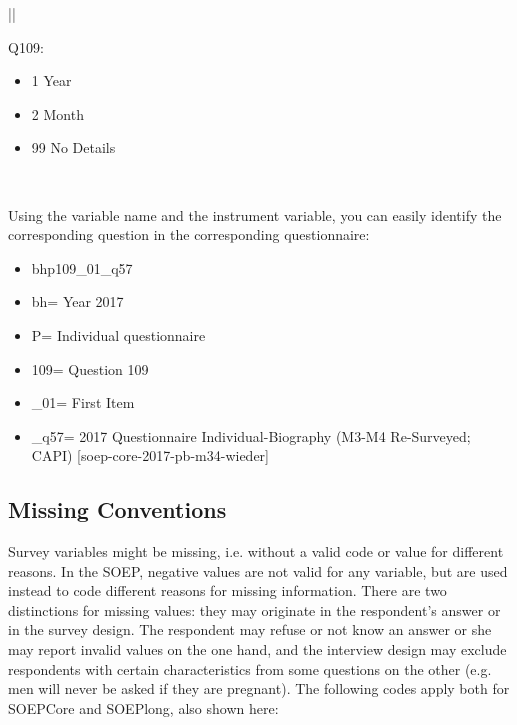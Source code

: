 \documentclass[letterpaper,10pt,openany,onesideH,english]{sphinxmanual}
\begin{document}
\begin{savenotes}\sphinxattablestart
\centering
\begin{tabular}[t]{|*{1}{|}}
\hline

Q109: 
\begin{itemize}
\item {} 
1  Year

\item {} 
2  Month

\item {} 
99 No Details

\end{itemize}
\\
\hline
\end{tabular}
\par
\sphinxattableend\end{savenotes}

Using the variable name and the instrument variable, you can easily identify the corresponding question in the corresponding questionnaire:
\begin{itemize}
\item {} 
bhp109\_01\_q57

\item {} 
bh= Year 2017

\item {} 
P= Individual questionnaire

\item {} 
109= Question 109

\item {} 
\_01= First Item

\item {} 
\_q57= 2017 Questionnaire Individual-Biography  (M3-M4 Re-Surveyed; CAPI) {[}soep-core-2017-pb-m34-wieder{]}

\end{itemize}


\subsection{Missing Conventions}
\label{\detokenize{Principles of Data Structure/index:missing-conventions}}\label{\detokenize{Principles of Data Structure/index:missings}}
Survey variables might be missing, i.e. without a valid code or value for different reasons. In the SOEP, negative values are not valid for any variable, but are used instead to code different reasons for missing information. There are two distinctions for missing values: they may originate in the respondent’s answer or in the survey design. The respondent may refuse or not know an answer or she may report invalid values on the one hand, and the interview design may exclude respondents with certain characteristics from some questions on the other (e.g. men will never be asked if they are pregnant). The following codes apply both for SOEPCore and SOEPlong, also shown here:
\end{document}
